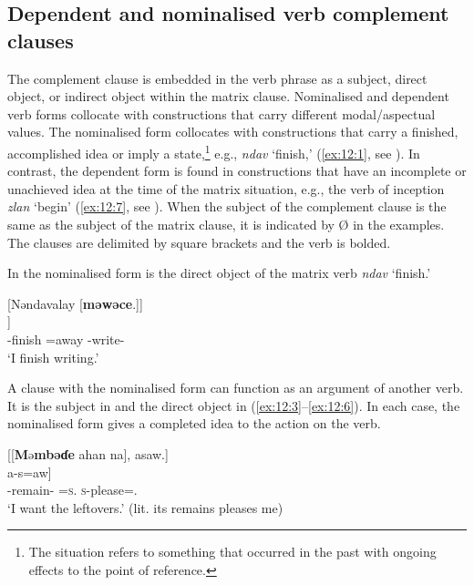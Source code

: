 \subsection{Dependent and nominalised verb complement clauses}\label{sec:12.1.1}
\hypertarget{RefHeading1213361525720847}{}
The complement clause is embedded in the verb phrase as a subject, direct object, or indirect object within the matrix clause.  Nominalised and dependent verb forms collocate with constructions that carry different modal/aspectual values. The nominalised form collocates %
with constructions that carry a finished, accomplished idea or imply a state,\footnote{The situation refers to something that occurred in the past with ongoing effects to the point of reference.} e.g., \textit{ndav} ‘finish,’ (\ref{ex:12:1}, see ). In contrast, the dependent form is found in constructions that have an incomplete or unachieved idea at the time of the matrix situation, e.g., the verb of inception %
\textit{zlan} ‘begin’ (\ref{ex:12:7}, see ). When the subject of the complement clause is the same as the subject of the matrix clause, it is indicated by Ø in the examples. The clauses are delimited by square brackets and the verb is bolded.

In  the nominalised form is the direct object of the matrix verb \textit{ndav} ‘finish.’ 

\ea \label{ex:12:1}
{}[Nəndavalay  [\textbf{məwəce}.]]\\
\gll  [nə-ndav =alaj    [Ø \textbf{mu-wutʃ-ɛ}]]\\
      {\oneS}-finish  =away    { }  {\NOM}-write-{\CL}\\
\glt  ‘I finish writing.’
\z 

A clause with the nominalised form can function as an argument of another verb. It is the subject in  and the direct object in (\ref{ex:12:3}--\ref{ex:12:6}). In each case, the nominalised form gives a completed idea to the action on the verb.

\ea \label{ex:12:2}
 [[\textbf{M}ə\textbf{mbəɗe} ahan   na],  asaw.]\\
\gll  [[\textbf{mɪ-mbɪɗ-ɛ}    =ahaŋ    na]   a-s=aw]\\
      {\NOM}-remain-{\CL}  =\textsc{s}.{\POSS}  {\PSP}  \textsc{s}-please={\oneS}.{\IO}\\
\glt  ‘I want the leftovers.’ (lit. its remains pleases me) 
\z 

